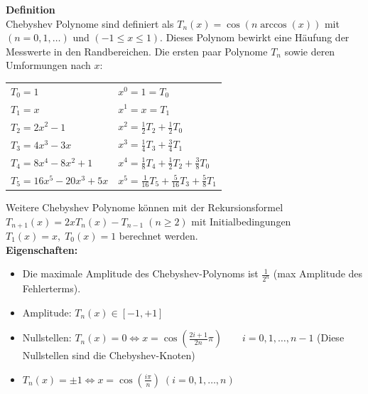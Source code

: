 \textbf{Definition}\\
Chebyshev Polynome sind definiert als $\boxed{T_n(x) = \cos(n \arccos(x))}$ mit $(n = 0,1,\ldots)$ und $(-1 \leq x \leq 1)$. Dieses 
Polynom bewirkt eine Häufung der Messwerte in den Randbereichen. Die
ersten paar Polynome $T_n$ sowie deren Umformungen nach $x$:\\
\begin{tabular}{ll}
  $T_0 = 1$ & $x^0 = 1 = T_0$ \\
  $T_1 = x$ & $x^1 = x = T_1$ \\
  $T_2 = 2x^2 -1$ & $x^2 = \frac12 T_2 + \frac12 T_0$ \\
  $T_3 = 4x^3 - 3x$ & $x^3 = \frac14 T_3 + \frac34 T_1$\\
  $T_4 = 8x^4 -8x^2 + 1$ & $x^4 = \frac18 T_4 + \frac12 T_2 + \frac38 T_0$\\
  $T_5 = 16x^5 - 20x^3 + 5x$ & $x^5 = \frac{1}{16} T_5 + \frac{5}{16} T_3 + \frac58 T_1$\\
\end{tabular}

Weitere Chebyshev Polynome können mit der Rekursionsformel $T_{n+1}(x) = 2x T_n(x)-T_{n-1}\;(n\geq2)$
mit Initialbedingungen $T_1(x)=x,\;T_0(x)=1$ berechnet werden.\\

\textbf{Eigenschaften: }
\begin{itemize}
  \item Die maximale Amplitude des Chebyshev-Polynoms ist $\frac{1}{2^n}$ (max Amplitude des Fehlerterms).
  \item Amplitude: $T_n(x) \in [-1,+1]$
  \item Nullstellen: $T_n(x)=0 \Leftrightarrow x=\cos(\frac{2i+1}{2n}\pi)\qquad i=0,1,\ldots,n-1$ (Diese Nullstellen sind die Chebyshev-Knoten)
  \item $T_n(x)= \pm 1 \Leftrightarrow x=\cos(\frac{i\pi}{n}) \; (i=0,1,\ldots,n)$
\end{itemize}

